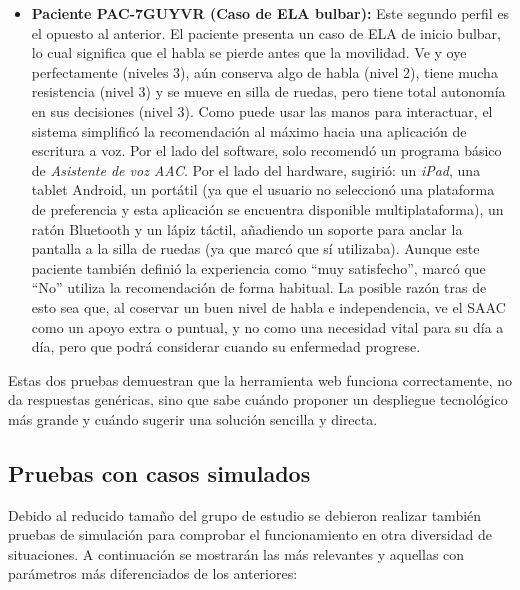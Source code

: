 \begin{itemize}
    	\item \textbf{Paciente PAC-7GUYVR (Caso de ELA bulbar):}  Este segundo perfil es el opuesto al anterior. El paciente presenta un caso de ELA de inicio bulbar, lo cual significa que el habla se pierde antes que la movilidad. Ve y oye perfectamente (niveles 3), aún conserva algo de 			habla (nivel 2), tiene mucha resistencia (nivel 3) y se mueve en silla de ruedas, pero tiene total autonomía en sus decisiones (nivel 3). Como puede usar las manos para interactuar, el sistema simplificó la recomendación al máximo hacia una aplicación de escritura a voz.
    	Por el lado del software, solo recomendó un programa básico de \textit{Asistente de voz AAC}. Por el lado del hardware, sugirió: un \textit{iPad}, una tablet Android, un portátil (ya que el usuario no seleccionó una plataforma de preferencia y esta aplicación se encuentra disponible  		multiplataforma), un ratón Bluetooth y un lápiz táctil, añadiendo un soporte para anclar la pantalla a la silla de ruedas (ya que marcó que sí utilizaba).
    	Aunque este paciente también definió la experiencia como ``muy satisfecho'', marcó que ``No'' utiliza la recomendación de forma habitual. La posible razón tras de esto sea que, al coservar un buen nivel de habla e independencia, ve el SAAC como un apoyo extra o 					puntual, y no como una necesidad vital para su día a día, pero que podrá considerar cuando su enfermedad progrese.
\end{itemize}
Estas dos pruebas demuestran que la herramienta web funciona correctamente, no da respuestas genéricas, sino que sabe cuándo proponer un despliegue tecnológico más grande y cuándo sugerir una solución sencilla y directa.

\subsection{Pruebas con casos simulados}
Debido al reducido tamaño del grupo de estudio se debieron realizar también pruebas de simulación para comprobar el funcionamiento en otra diversidad de situaciones. A continuación se mostrarán las más relevantes y aquellas con parámetros más diferenciados de los anteriores:

